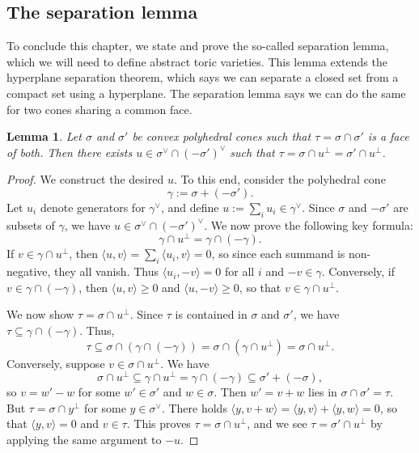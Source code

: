 \documentclass[12pt]{amsart}
\theoremstyle{plain}
\newtheorem{lemma}[theorem]{Lemma}
\begin{document}
\subsection{The separation lemma}
To conclude this chapter, we state and prove the so-called separation lemma, which we will need to define abstract toric varieties.
This lemma extends the hyperplane separation theorem, which says we can separate a closed set from a compact set using a hyperplane.
The separation lemma says we can do the same for two cones sharing a common face.

\begin{lemma}
Let $\sigma$ and $\sigma'$ be convex polyhedral cones such that $\tau = \sigma \cap \sigma'$ is a face of both.
Then there exists $u \in \sigma^\vee \cap (-\sigma')^\vee$ such that $\tau = \sigma \cap u^\perp = \sigma' \cap u^\perp$.
\end{lemma}
\begin{proof}
We construct the desired $u$.
To this end, consider the polyhedral cone 
$$\gamma := \sigma + (-\sigma').$$
Let $u_i$ denote generators for $\gamma^\vee$, and define $u := \sum_i u_i \in \gamma^\vee$.
Since $\sigma$ and $-\sigma'$ are subsets of $\gamma$, we have $u \in \sigma^\vee \cap (-\sigma')^\vee$.
We now prove the following key formula:
$$\gamma \cap u^\perp = \gamma \cap (-\gamma).$$
If $v \in \gamma \cap u^\perp$, then $\langle u, v \rangle = \sum_i \langle u_i, v\rangle = 0$, so since each summand is non-negative, they all vanish.
Thus $\langle u_i, -v \rangle = 0$ for all $i$ and $-v \in \gamma$.
Conversely, if $v \in \gamma \cap (-\gamma)$, then $\langle u, v \rangle \ge 0$ and $\langle u, -v \rangle \ge 0$, so that $v \in \gamma \cap u^\perp$.

We now show $\tau = \sigma \cap u^\perp$.
Since $\tau$ is contained in $\sigma$ and $\sigma'$, we have $\tau \subseteq \gamma \cap (-\gamma)$.
Thus,
$$\tau \subseteq \sigma \cap (\gamma \cap (-\gamma)) = \sigma \cap (\gamma \cap u^\perp) = \sigma \cap u^\perp.$$
Conversely, suppose $v \in \sigma \cap u^\perp$.
We have
$$\sigma \cap u^\perp \subseteq \gamma \cap u^\perp = \gamma \cap (-\gamma) \subseteq \sigma' + (-\sigma),$$
so $v = w' - w$ for some $w' \in \sigma'$ and $w \in \sigma$.
Then $w' = v + w$ lies in $\sigma \cap \sigma' = \tau$.
But $\tau = \sigma \cap y^\perp$ for some $y \in \sigma^\vee$.
There holds $\langle y, v + w \rangle = \langle y, v \rangle + \langle y, w \rangle = 0$, so that $\langle y, v \rangle = 0$ and $v \in \tau$.
This proves $\tau = \sigma \cap u^\perp$, and we see $\tau = \sigma' \cap u^\perp$ by applying the same argument to $-u$.
\end{proof}
\end{document}
